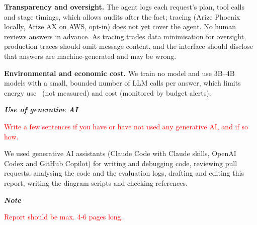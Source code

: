 \documentclass[a4paper,10pt]{article}
\newcommand{\instructions}[1]{\textcolor{red}{#1}}
\begin{document}
\textbf{Transparency and oversight.} The agent logs each request's plan, tool calls and stage timings, which allows audits after the fact; tracing (Arize Phoenix locally, Arize AX on AWS, opt-in) does not yet cover the agent. No human reviews answers in advance. As tracing trades data minimisation for oversight, production traces should omit message content, and the interface should disclose that answers are machine-generated and may be wrong.

\textbf{Environmental and economic cost.} We train no model and use 3B--4B models with a small, bounded number of LLM calls per answer, which limits energy use~\cite{luccioni2024power} (not measured) and cost (monitored by budget alerts).

	
\hfill \break
\textit{\textbf{Use of generative AI}}

\instructions{Write a few sentences if you have or have not used any generative AI, and if so how.}

We used generative AI assistants (Claude Code with Claude skills, OpenAI Codex and GitHub Copilot) for writing and debugging code, reviewing pull requests, analysing the code and the evaluation logs, drafting and editing this report, writing the diagram scripts and checking references.


\hfill \break
\textit{\textbf{Note}}

\instructions{Report should be max. 4-6 pages long.}
\end{document}
